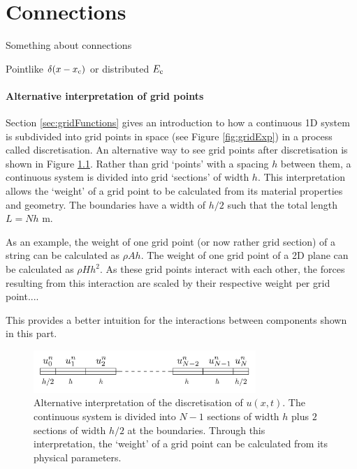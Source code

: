 \chapter{Connections}\label{ch:connections}
Something about connections

Pointlike $\delta(x-x_{\text{c}})$ or distributed $E_{\text{c}}$
\subsubsection{Alternative interpretation of grid points}
Section \ref{sec:gridFunctions} gives an introduction to how a continuous 1D system is subdivided into grid points in space (see Figure \ref{fig:gridExp}) in a process called discretisation. An alternative way to see grid points after discretisation is shown in Figure \ref{fig:gridExp2}. Rather than grid `points' with a spacing $h$ between them, a continuous system is divided into grid `sections' of width $h$. This interpretation allows the `weight' of a grid point to be calculated from its material properties and geometry. The boundaries have a width of $h/2$ such that the total length $L = Nh$ m.

As an example, the weight of one grid point (or now rather grid section) of a string can be calculated as $\rho A h$. The weight of one grid point of a 2D plane can be calculated as $\rho H h^2$. As these grid points interact with each other, the forces resulting from this interaction are scaled by their respective weight per grid point....

This provides a better intuition for the interactions between components shown in this part. 

\begin{figure}[h]
    \centering
    \includegraphics[width=0.75\textwidth]{figures/fdtd/gridFigure2.pdf}
    \caption{Alternative interpretation of the discretisation of $u(x,t)$. The continuous system is divided into $N-1$ sections of width $h$ plus $2$ sections of width $h/2$ at the boundaries. Through this interpretation, the `weight' of a grid point can be calculated from its physical parameters. \label{fig:gridExp2}}
\end{figure}


